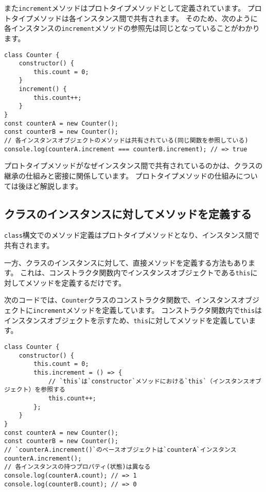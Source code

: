 また\texttt{increment}メソッドはプロトタイプメソッドとして定義されています。
プロトタイプメソッドは各インスタンス間で共有されます。
そのため、次のように各インスタンスの\texttt{increment}メソッドの参照先は同じとなっていることがわかります。

\begin{lstlisting}
class Counter {
    constructor() {
        this.count = 0;
    }
    increment() {
        this.count++;
    }
}
const counterA = new Counter();
const counterB = new Counter();
// 各インスタンスオブジェクトのメソッドは共有されている(同じ関数を参照している)
console.log(counterA.increment === counterB.increment); // => true
\end{lstlisting}

プロトタイプメソッドがなぜインスタンス間で共有されているのかは、クラスの継承の仕組みと密接に関係しています。
プロトタイプメソッドの仕組みについては後ほど解説します。

\hypertarget{class-instance-method}{%
\subsection{クラスのインスタンスに対してメソッドを定義する}\label{class-instance-method}}

\texttt{class}構文でのメソッド定義はプロトタイプメソッドとなり、インスタンス間で共有されます。

一方、クラスのインスタンスに対して、直接メソッドを定義する方法もあります。
これは、コンストラクタ関数内でインスタンスオブジェクトである\texttt{this}に対してメソッドを定義するだけです。

次のコードでは、\texttt{Counter}クラスのコンストラクタ関数で、インスタンスオブジェクトに\texttt{increment}メソッドを定義しています。
コンストラクタ関数内で\texttt{this}はインスタンスオブジェクトを示すため、\texttt{this}に対してメソッドを定義しています。

\begin{lstlisting}
class Counter {
    constructor() {
        this.count = 0;
        this.increment = () => {
            // `this`は`constructor`メソッドにおける`this`（インスタンスオブジェクト）を参照する
            this.count++;
        };
    }
}
const counterA = new Counter();
const counterB = new Counter();
// `counterA.increment()`のベースオブジェクトは`counterA`インスタンス
counterA.increment();
// 各インスタンスの持つプロパティ(状態)は異なる
console.log(counterA.count); // => 1
console.log(counterB.count); // => 0
\end{lstlisting}

